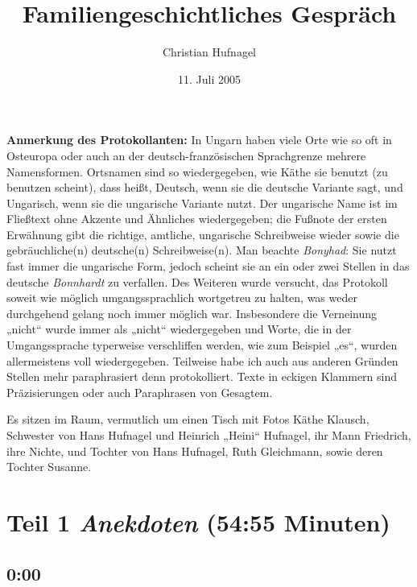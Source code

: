 \documentclass[ngerman,]{article}
\title{Familiengeschichtliches Gespräch}
\author{Christian Hufnagel}
\date{11. Juli 2005}
\begin{document}
	
					\maketitle
		
		

		{
				\setcounter{tocdepth}{3}
		\tableofcontents
					\clearpage
			}
	
\begin{multicols}{3}
\textbf{Anmerkung des Protokollanten:} In Ungarn haben viele Orte wie so
oft in Osteuropa oder auch an der deutsch-französischen Sprachgrenze
mehrere Namensformen. Ortsnamen sind so wiedergegeben, wie Käthe sie
benutzt (zu benutzen scheint), dass heißt, Deutsch, wenn sie die
deutsche Variante sagt, und Ungarisch, wenn sie die ungarische Variante
nutzt. Der ungarische Name ist im Fließtext ohne Akzente und Ähnliches
wiedergegeben; die Fußnote der ersten Erwähnung gibt die richtige,
amtliche, ungarische Schreibweise wieder sowie die gebräuchliche(n)
deutsche(n) Schreibweise(n). Man beachte \emph{Bonyhad}: Sie nutzt fast
immer die ungarische Form, jedoch scheint sie an ein oder zwei Stellen
in das deutsche \emph{Bonnhardt} zu verfallen. Des Weiteren wurde
versucht, das Protokoll soweit wie möglich umgangssprachlich wortgetreu
zu halten, was weder durchgehend gelang noch immer möglich war.
Insbesondere die Verneinung „nicht“ wurde immer als „nicht“
wiedergegeben und Worte, die in der Umgangssprache typerweise
verschliffen werden, wie zum Beispiel „es“, wurden allermeistens voll
wiedergegeben. Teilweise habe ich auch aus anderen Gründen Stellen mehr
paraphrasiert denn protokolliert. Texte in eckigen Klammern sind
Präzisierungen oder auch Paraphrasen von Gesagtem.

Es sitzen im Raum, vermutlich um einen Tisch mit Fotos Käthe Klausch,
Schwester von Hans Hufnagel und Heinrich „Heini“ Hufnagel, ihr Mann
Friedrich, ihre Nichte, und Tochter von Hans Hufnagel, Ruth Gleichmann,
sowie deren Tochter Susanne.

\hypertarget{anekdoten}{%
\section{\texorpdfstring{Teil 1 \emph{Anekdoten} (54:55
Minuten)}{Teil 1 Anekdoten (54:55 Minuten)}}\label{anekdoten}}

\hypertarget{section}{%
\subsection{0:00}\label{section}}


\end{multicols}
\end{document}
